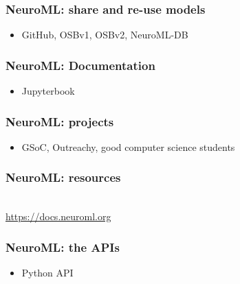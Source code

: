 \begin{frame}[c]
  \frametitle{NeuroML: share and re-use models}
  \begin{itemize}
    \item GitHub, OSBv1, OSBv2, NeuroML-DB
  \end{itemize}
\end{frame}
\begin{frame}[c]
  \frametitle{NeuroML: Documentation}
  \begin{itemize}
    \item Jupyterbook
  \end{itemize}
\end{frame}
\begin{frame}[c]
  \frametitle{NeuroML: projects}
  \begin{itemize}
    \item GSoC, Outreachy, good computer science students
  \end{itemize}
\end{frame}
\begin{frame}[c]
  \frametitle{NeuroML: resources}
  \begin{center}
    \\
    \Large{\url{https://docs.neuroml.org}}
  \end{center}
\end{frame}
\begin{frame}[c]
  \frametitle{NeuroML: the APIs}
  \begin{itemize}
    \item Python API
  \end{itemize}
\end{frame}

